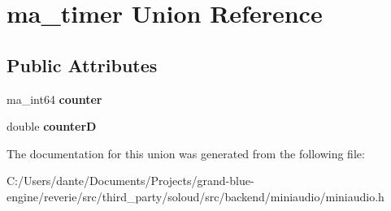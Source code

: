 \hypertarget{unionma__timer}{}\section{ma\+\_\+timer Union Reference}
\label{unionma__timer}
\subsection*{Public Attributes}
\begin{DoxyCompactItemize}
\item 
\mbox{\label{unionma__timer_aa50f64d2e00b8ea7437bd5186710accb}} 
ma\+\_\+int64 {\bfseries counter}
\item 
\mbox{\label{unionma__timer_aa4af842259e0dd69b5ac2c2eab1fcf5f}} 
double {\bfseries counterD}
\end{DoxyCompactItemize}


The documentation for this union was generated from the following file\+:\begin{DoxyCompactItemize}
\item 
C\+:/\+Users/dante/\+Documents/\+Projects/grand-\/blue-\/engine/reverie/src/third\+\_\+party/soloud/src/backend/miniaudio/miniaudio.\+h\end{DoxyCompactItemize}
